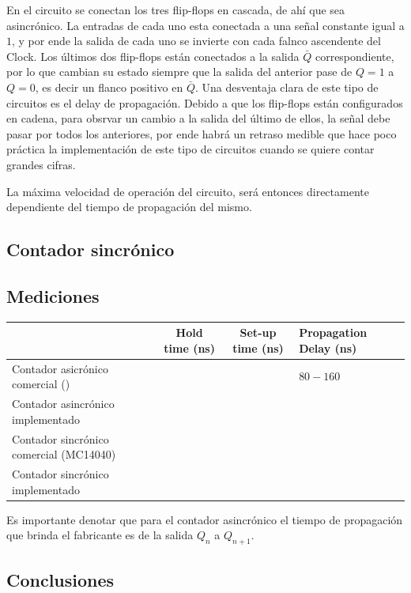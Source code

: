 En el circuito se conectan los tres flip-flops en cascada, de ahí que sea asincrónico. La entradas de cada uno esta conectada a una señal constante igual a $1$, y por ende la salida de cada uno se invierte con cada falnco ascendente del Clock. Los últimos dos flip-flops están conectados a la salida $\bar{Q}$ correspondiente, por lo que cambian su estado siempre que la salida del anterior pase de $Q = 1$ a $Q = 0$, es decir un flanco positivo en $\bar{Q}$. Una desventaja clara de este tipo de circuitos es el delay de propagación. Debido a que los flip-flops están configurados en cadena, para obsrvar un cambio a la salida del último de ellos, la señal debe pasar por todos los anteriores, por ende habrá un retraso medible que hace poco práctica la implementación de este tipo de circuitos cuando se quiere contar grandes cifras. 


La máxima velocidad de operación del circuito, será entonces directamente dependiente del tiempo de propagación del mismo. 


\subsection{Contador sincrónico}


\subsection{Mediciones}

\begin{table}[H]
\begin{tabular}{llll}\hline
\multicolumn{1}{c}{}           & \multicolumn{1}{c}{Hold time (ns)} & \multicolumn{1}{c}{Set-up time (ns)} & Propagation Delay (ns) \\
\hline
Contador asicr\'onico comercial ()    &                                &                                & $80-160$                  \\
Contador asincr\'onico implementado        &                                    &                                      &                        \\
Contador sincr\'onico comercial (MC14040) &                             &                          &                 \\
Contador sincr\'onico implementado   &                                    &                                      &                        \\  \hline
\end{tabular}
\end{table}

Es importante denotar que para el contador asincr\'onico el tiempo de propagaci\'on que brinda el fabricante es de la salida $Q_n$ a $Q_{n+1}$. 
\subsection{Conclusiones}

